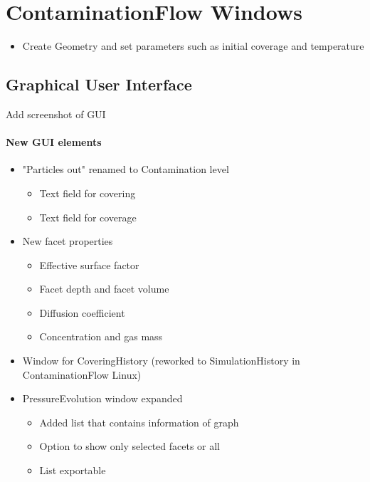 
\chapter{ContaminationFlow Windows}\label{chapter:Windows}

\begin{itemize}[noitemsep,topsep=0pt]
\item Create Geometry and set parameters such as initial coverage and temperature
\end{itemize}

\section{Graphical User Interface}
Add screenshot of GUI

\subsubsection{New GUI elements}
\begin{itemize}[noitemsep,topsep=0pt]
\item "Particles out" renamed to Contamination level
\begin{itemize}[noitemsep,topsep=0pt]
\item Text field for covering
\item Text field for coverage
\end{itemize}
\item New facet properties
\begin{itemize}[noitemsep,topsep=0pt]
\item Effective surface factor
\item Facet depth and facet volume
\item Diffusion coefficient
\item Concentration and gas mass
\end{itemize}
\item Window for CoveringHistory (reworked to SimulationHistory in ContaminationFlow Linux)
\item PressureEvolution window expanded
	\begin{itemize}[noitemsep,topsep=0pt]
	\item Added list that contains information of graph
	\item Option to show only selected facets or all
	\item List exportable
	\end{itemize}
\end{itemize}

